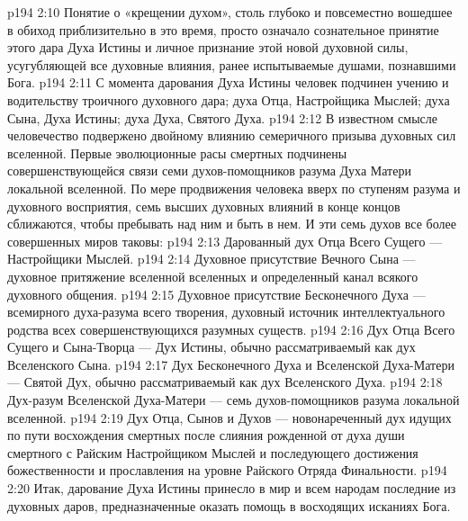 \vs p194 2:10 \pc Понятие о «крещении духом», столь глубоко и повсеместно вошедшее в обиход приблизительно в это время, просто означало сознательное принятие этого дара Духа Истины и личное признание этой новой духовной силы, усугубляющей все духовные влияния, ранее испытываемые душами, познавшими Бога.
\vs p194 2:11 \pc С момента дарования Духа Истины человек подчинен учению и водительству троичного духовного дара; духа Отца, Настройщика Мыслей; духа Сына, Духа Истины; духа Духа, Святого Духа.
\vs p194 2:12 В известном смысле человечество подвержено двойному влиянию семеричного призыва духовных сил вселенной. Первые эволюционные расы смертных подчинены совершенствующейся связи семи духов\hyp{}помощников разума Духа Матери локальной вселенной. По мере продвижения человека вверх по ступеням разума и духовного восприятия, семь высших духовных влияний в конце концов сближаются, чтобы пребывать над ним и быть в нем. И эти семь духов все более совершенных миров таковы:
\vs p194 2:13 \bibnobreakspace Дарованный дух Отца Всего Сущего --- Настройщики Мыслей.
\vs p194 2:14 \pc {}\bibnobreakspace Духовное присутствие Вечного Сына --- духовное притяжение вселенной вселенных и определенный канал всякого духовного общения.
\vs p194 2:15 \pc {}\bibnobreakspace Духовное присутствие Бесконечного Духа --- всемирного духа\hyp{}разума всего творения, духовный источник интеллектуального родства всех совершенствующихся разумных существ.
\vs p194 2:16 \pc {}\bibnobreakspace Дух Отца Всего Сущего и Сына\hyp{}Творца --- Дух Истины, обычно рассматриваемый как дух Вселенского Сына.
\vs p194 2:17 \pc {}\bibnobreakspace Дух Бесконечного Духа и Вселенской Духа\hyp{}Матери --- Святой Дух, обычно рассматриваемый как дух Вселенского Духа.
\vs p194 2:18 \pc {}\bibnobreakspace Дух\hyp{}разум Вселенской Духа\hyp{}Матери --- семь духов\hyp{}помощников разума локальной вселенной.
\vs p194 2:19 \pc {}\bibnobreakspace Дух Отца, Сынов и Духов --- новонареченный дух идущих по пути восхождения смертных после слияния рожденной от духа души смертного с Райским Настройщиком Мыслей и последующего достижения божественности и прославления на уровне Райского Отряда Финальности.
\vs p194 2:20 \pc Итак, дарование Духа Истины принесло в мир и всем народам последние из духовных даров, предназначенные оказать помощь в восходящих исканиях Бога.

